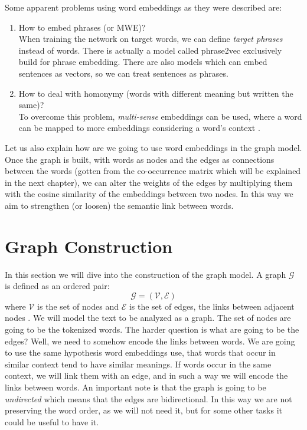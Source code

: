 \documentclass[12pt]{article}
\numberwithin{equation}{section}
\begin{document}
\begin{spacing}{1.5}
	Some apparent problems using word embeddings as they were described are:
	\begin{enumerate}
		\item How to embed phrases (or MWE)?\\
		When training the network on target words, we can define \textit{target phrases} instead of words. There is actually a model called phrase2vec exclusively build for phrase embedding. There are also models which can embed sentences as vectors, so we can treat sentences as phrases.
		\item How to deal with homonymy (words with different meaning but written the same)? \\
		To overcome this problem, \textit{multi-sense} embeddings can be used, where a word can be mapped to more embeddings considering a word's context \cite{multi_sense_we}. 
	\end{enumerate}
	
	Let us also explain how are we going to use word embeddings in the graph model. Once the graph is built, with words as nodes and the edges as connections between the words (gotten from the co-occurrence matrix which will be explained in the next chapter), we can alter the weights of the edges by multiplying them with the cosine similarity of the embeddings between two nodes. In this way we aim to strengthen (or loosen) the semantic link between words.
	
	\newpage
	\section{Graph Construction}
	In this section we will dive into the construction of the graph model. A graph $\mathcal{G}$ is defined as an ordered pair:
	\begin{equation}
		\mathcal{G} = (\mathcal{V},\mathcal{E})
	\end{equation}
	where $\mathcal{V}$ is the set of nodes and $\mathcal{E}$ is the set of edges, the links between adjacent nodes \cite{juricGrafovi}. We will model the text to be analyzed as a graph. The set of nodes are going to be the tokenized words. The harder question is what are going to be the edges?
	Well, we need to somehow encode the links between words. We are going to use the same hypothesis word embeddings use, that words that occur in similar context tend to have similar meanings. If words occur in the same context, we will link them with an edge, and in such a way we will encode the links between words. An important note is that the graph is going to be \textit{undirected} which means that the edges are bidirectional. In this way we are not preserving the word order, as we will not need it, but for some other tasks it could be useful to have it.
	

\end{spacing}
\end{document}
